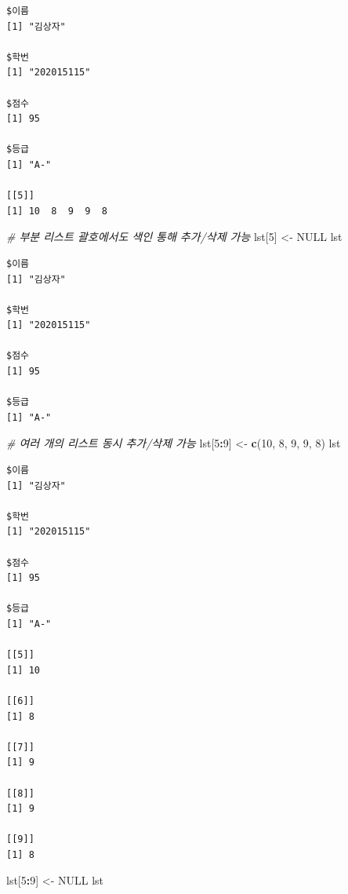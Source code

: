 \documentclass[
  11pt,
]{krantz}
\newenvironment{Shaded}{\begin{snugshade}}{\end{snugshade}}
\newcommand{\CommentTok}[1]{\textcolor[rgb]{0.37,0.37,0.37}{\textit{#1}}}
\newcommand{\DecValTok}[1]{\textcolor[rgb]{0.06,0.06,0.06}{#1}}
\newcommand{\KeywordTok}[1]{\textcolor[rgb]{0.27,0.27,0.27}{\textbf{#1}}}
\newcommand{\NormalTok}[1]{#1}
\newcommand{\OperatorTok}[1]{\textcolor[rgb]{0.43,0.43,0.43}{\textbf{#1}}}
\newcommand{\OtherTok}[1]{\textcolor[rgb]{0.37,0.37,0.37}{#1}}
\newcommand{\StringTok}[1]{\textcolor[rgb]{0.5,0.5,0.5}{#1}}
\begin{document}
\begin{verbatim}
$이름
[1] "김상자"

$학번
[1] "202015115"

$점수
[1] 95

$등급
[1] "A-"

[[5]]
[1] 10  8  9  9  8
\end{verbatim}

\begin{Shaded}
\begin{Highlighting}[]
\CommentTok{# 부분 리스트 괄호에서도 색인 통해 추가/삭제 가능}
\NormalTok{lst[}\DecValTok{5}\NormalTok{] <-}\StringTok{ }\OtherTok{NULL}
\NormalTok{lst}
\end{Highlighting}
\end{Shaded}

\begin{verbatim}
$이름
[1] "김상자"

$학번
[1] "202015115"

$점수
[1] 95

$등급
[1] "A-"
\end{verbatim}

\begin{Shaded}
\begin{Highlighting}[]
\CommentTok{# 여러 개의 리스트 동시 추가/삭제 가능}
\NormalTok{lst[}\DecValTok{5}\OperatorTok{:}\DecValTok{9}\NormalTok{] <-}\StringTok{  }\KeywordTok{c}\NormalTok{(}\DecValTok{10}\NormalTok{, }\DecValTok{8}\NormalTok{, }\DecValTok{9}\NormalTok{, }\DecValTok{9}\NormalTok{, }\DecValTok{8}\NormalTok{)}
\NormalTok{lst}
\end{Highlighting}
\end{Shaded}

\begin{verbatim}
$이름
[1] "김상자"

$학번
[1] "202015115"

$점수
[1] 95

$등급
[1] "A-"

[[5]]
[1] 10

[[6]]
[1] 8

[[7]]
[1] 9

[[8]]
[1] 9

[[9]]
[1] 8
\end{verbatim}

\begin{Shaded}
\begin{Highlighting}[]
\NormalTok{lst[}\DecValTok{5}\OperatorTok{:}\DecValTok{9}\NormalTok{] <-}\StringTok{  }\OtherTok{NULL}
\NormalTok{lst}
\end{Highlighting}
\end{Shaded}
\end{document}
